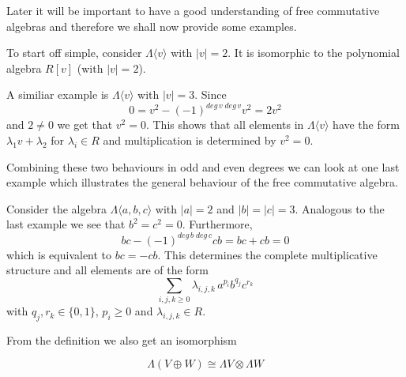 Later it will be important to have a good understanding of free commutative algebras and therefore
we shall now provide some examples.

\begin{Example}
\label{ex:FreeCommutativeEvenDegrees}
 To start off simple, consider $\Lambda \langle v \rangle$ with $|v| = 2$. 
 It is isomorphic to the polynomial algebra $R[v]$ (with $|v| = 2$).
\end{Example}

\begin{Example}
\label{ex:FreeCommutativeOddDegrees}
 A similiar example is $\Lambda \langle v \rangle$ with $|v| = 3$. Since 
 $$0 = v^2 - (-1)^{deg \, v \; deg \, v} v^2 = 2 v^2$$
 and $2 \neq 0$ we get that $v^2 = 0$. This shows that all elements in $\Lambda \langle v \rangle$
 have the form $\lambda_1 v + \lambda_2$ for $\lambda_i \in R$ and multiplication is determined by $v^2 = 0$.
\end{Example}

Combining these two behaviours in odd and even degrees we can look at one last example which
illustrates the general behaviour of the free commutative algebra.

\begin{Example}
 Consider the algebra $\Lambda \langle a,b,c \rangle$ with $|a| = 2$ and $|b| = |c| = 3$.
 Analogous to the last example we see that $b^2 = c^2 = 0$. Furthermore,
 $$ bc - (-1)^{deg \, b \; deg \, c} cb = bc + cb = 0$$
 which is equivalent to $bc = - cb$. This determines the complete multiplicative structure 
 and all elements are of the form 
 $$ \sum_{i,j,k \geq 0} \lambda_{i,j,k} \, a^{p_i} b^{q_j} c^{r_k}$$
 with  $q_j, r_k \in \lbrace 0,1 \rbrace$, $p_i \geq 0$ and $\lambda_{i,j,k} \in R$.
\end{Example}

\begin{Remark}
\label{rem:FreeCommutativeSplits}
From the definition we also get an isomorphism 

$$ \Lambda ( V \oplus W) \cong \Lambda V \otimes \Lambda W $$

\end{Remark}
